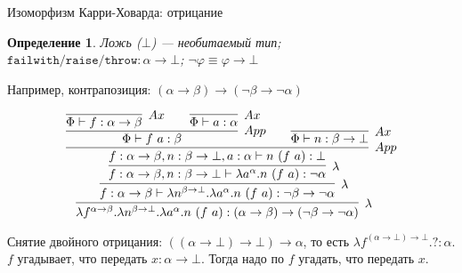 \documentclass[aspectratio=169]{beamer}
\newtheorem{dfn}{Определение}[section]
\begin{document}
\begin{frame}{Изоморфизм Карри-Ховарда: отрицание}

\begin{dfn}Ложь ($\bot$) --- необитаемый тип;
$\texttt{failwith/raise/throw} : \alpha\rightarrow\bot$; $\neg\varphi\equiv\varphi\rightarrow\bot$
 \end{dfn}

Например, контрапозиция:
$(\alpha\rightarrow\beta)\rightarrow(\neg\beta\rightarrow\neg\alpha)$

$$\infer[\lambda]{\lambda f^{\alpha\rightarrow\beta}.\lambda n^{\beta\rightarrow\bot}.\lambda a^\alpha.n\ (f\ a): (\alpha\rightarrow\beta)\rightarrow(\neg\beta\rightarrow\neg\alpha)}
        {\infer[\lambda]{f:\alpha\rightarrow\beta\vdash\lambda n^{\beta\rightarrow\bot}.\lambda a^\alpha.n\ (f\ a): \neg\beta\rightarrow\neg\alpha}
               {\infer[\lambda]{f:\alpha\rightarrow\beta,n:\beta\rightarrow\bot\vdash\lambda a^\alpha.n\ (f\ a): \neg\alpha}{
                       \infer[App]{f:\alpha\rightarrow\beta,n:\beta\rightarrow\bot, a:\alpha \vdash n\ (f\ a): \bot}{
                              \infer[App]{\Phi \vdash f\ a: \beta}{\infer[Ax]{\Phi \vdash f:\alpha\rightarrow\beta}{}\quad\quad \infer[Ax]{\Phi \vdash a: \alpha}{}}
    \quad\quad \infer[Ax]{\Phi \vdash n: \beta\rightarrow\bot}{}
               }
               }}}$$

Снятие двойного отрицания: $((\alpha\rightarrow\bot)\rightarrow\bot)\rightarrow\alpha$, то есть $\lambda f^{(\alpha\rightarrow\bot)\rightarrow\bot}.?: \alpha$.\\
$f$ угадывает, что передать $x: \alpha\rightarrow\bot$. Тогда надо по $f$ угадать, что передать $x$.
\end{frame}
\end{document}
